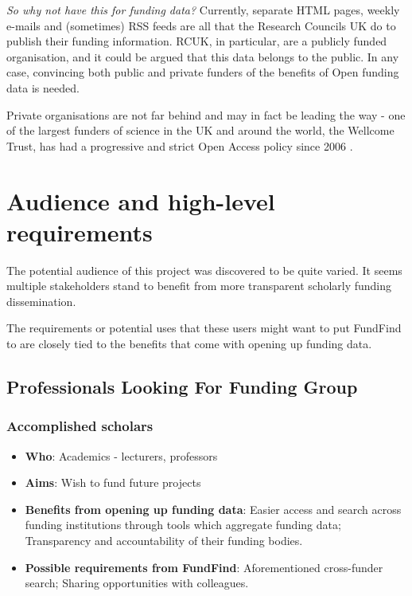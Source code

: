 \emph{So why not have this for funding data?} Currently, separate HTML pages, weekly e-mails and (sometimes) RSS feeds are all that the Research Councils UK do to publish their funding information. RCUK, in particular, are a publicly funded organisation, and it could be argued that this data belongs to the public. In any case, convincing both public and private funders of the benefits of Open funding data is needed.

Private organisations are not far behind and may in fact be leading the way - one of the largest funders of science in the UK and around the world, the Wellcome Trust, has had a progressive and strict Open Access policy since 2006 \cite{wellcome-oa}.

\section{Audience and high-level requirements}
\label{audience}
The potential audience of this project was discovered to be quite varied. It seems multiple stakeholders stand to benefit from more transparent scholarly funding dissemination.

The requirements or potential uses that these users might want to put FundFind to are closely tied to the benefits that come with opening up funding data.

\subsection{Professionals Looking For Funding Group}
\label{audience-professionals}
\subsubsection{Accomplished scholars}
\begin{itemize}
 \item \textbf{Who}: Academics - lecturers, professors
 \item \textbf{Aims}: Wish to fund future projects
 \item \textbf{Benefits from opening up funding data}: Easier access and search across funding institutions through tools which aggregate funding data; Transparency and accountability of their funding bodies.
 \item \textbf{Possible requirements from FundFind}: Aforementioned cross-funder search; Sharing opportunities with colleagues.
\end{itemize}

